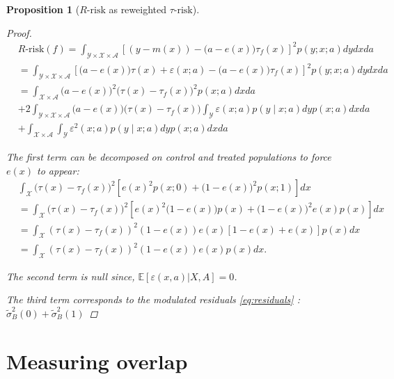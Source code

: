 \documentclass[french,12pt,twoside,a4paper]{book}
\newtheorem{proposition*}{Proposition}
\newtheorem{proof}{Proof}
\begin{document}
\begin{appendices}
\begin{proposition*}[$R\text{-risk}$ as reweighted $\tau
        \text{-risk}$]
\begin{proof}
      \begin{align*}
         & R\text {-risk}(f) =\int_{\mathcal{Y} \times \mathcal{X} \times \mathcal{A}}[(y-m(x))-\big(a-e(x)\big) \tau_f(x)]^{2} p(y ; x ; a) d y d x d a                                     \\
         & =\int_{\mathcal{Y} \times \mathcal{X} \times \mathcal{A}} \left[\big(a-e(x)\big)\tau(x)+\varepsilon(x ; a)-\big(a-e(x)\big) \tau_f(x)\right]^{2} p(y ; x ; a) d y d x da          \\
         & =\int_{\mathcal{X} \times \mathcal{A}}\big(a-e(x)\big)^{2}\big(\tau(x)- \tau_f(x)\big)^{2} p(x ; a) d x d a                                                                       \\
         & + 2  \int_{\mathcal{Y} \times \mathcal{X} \times \mathcal{A}}\big(a-e(x)\big)\big(\tau(x)-\tau_f(x)\big)  \int_{\mathcal{Y}} \varepsilon(x ; a) p(y \mid x ; a) d y p(x ; a)dx da \\
         & +\int_{\mathcal{X} \times \mathcal{A}} \int_{\mathcal{Y}} \varepsilon^{2}(x ; a) p(y \mid x ; a) d y p(x ; a) d x d a
      \end{align*}

      The first term can be decomposed on control and treated populations to force
      $e(x)$ to appear:
      \begin{align*}
         & \int_{\mathcal{X}}\big(\tau(x)-\tau_f(x)\big)^{2}\left[e(x)^{2}p(x;0) + \big(1-e(x)\big)^{2} p(x;1)\right] d x                    \\
         & =\int_{\mathcal{X}}\big(\tau(x)-\tau_f(x)\big)^{2}  \left[e(x)^{2}\big(1-e(x)\big)p(x) + \big(1-e(x)\big)^{2}e(x) p(x)\right] d x \\
         & =\int_{\mathcal{X}}(\tau(x)-\tau_f(x))^{2}(1-e(x)) e(x)[1-e(x)+e(x)] p(x) d x                                                     \\ &=\int_{\mathcal{X}}(\tau(x)-\tau_f(x))^{2}(1-e(x)) e(x) p(x) d x.
      \end{align*}

      The second term is null since, $\mathbb E[\varepsilon(x, a) |X, A]=0$.

      The third term corresponds to the modulated residuals \ref{eq:residuals} :
      $\tilde{\sigma}_B^2(0) + \tilde{\sigma}_B^2(1)$

    \end{proof}
  \end{proposition*}

  \section{Measuring overlap}\label{apd:motivation_ntv}


\end{appendices}
\end{document}
